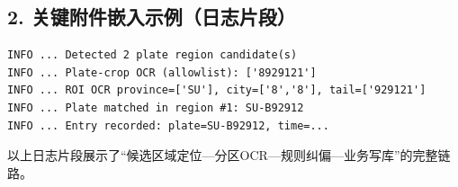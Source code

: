 \documentclass[12pt,a4paper]{article}
\begin{document}
\subsection*{2. 关键附件嵌入示例（日志片段）}
\begin{lstlisting}
INFO ... Detected 2 plate region candidate(s)
INFO ... Plate-crop OCR (allowlist): ['8929121']
INFO ... ROI OCR province=['SU'], city=['8','8'], tail=['929121']
INFO ... Plate matched in region #1: SU-B92912
INFO ... Entry recorded: plate=SU-B92912, time=...
\end{lstlisting}

以上日志片段展示了“候选区域定位—分区OCR—规则纠偏—业务写库”的完整链路。
\end{document}
